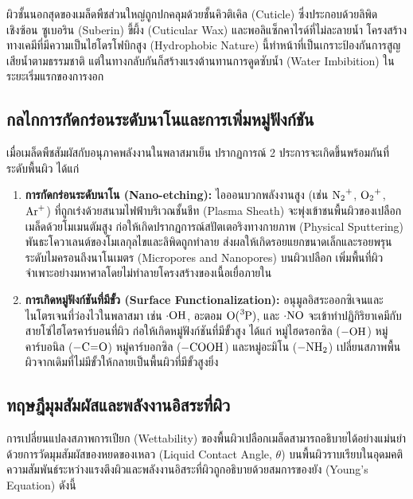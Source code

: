 ผิวชั้นนอกสุดของเมล็ดพืชส่วนใหญ่ถูกปกคลุมด้วยชั้นคิวติเคิล (Cuticle) ซึ่งประกอบด้วยลิพิดเชิงซ้อน ซูเบอริน (Suberin) ขี้ผึ้ง (Cuticular Wax) และพอลิแซ็กคาไรด์ที่ไม่ละลายน้ำ โครงสร้างทางเคมีที่มีความเป็นไฮโดรโฟบิกสูง (Hydrophobic Nature) นี้ทำหน้าที่เป็นเกราะป้องกันการสูญเสียน้ำตามธรรมชาติ แต่ในทางกลับกันก็สร้างแรงต้านทานการดูดซับน้ำ (Water Imbibition) ในระยะเริ่มแรกของการงอก

\subsection{กลไกการกัดกร่อนระดับนาโนและการเพิ่มหมู่ฟังก์ชัน}

เมื่อเมล็ดพืชสัมผัสกับอนุภาคพลังงานในพลาสมาเย็น ปรากฏการณ์ 2 ประการจะเกิดขึ้นพร้อมกันที่ระดับพื้นผิว ได้แก่

\begin{enumerate}
    \item \textbf{การกัดกร่อนระดับนาโน (Nano-etching):} ไอออนบวกพลังงานสูง (เช่น $\ce{N2+}$, $\ce{O2+}$, $\ce{Ar+}$) ที่ถูกเร่งด้วยสนามไฟฟ้าบริเวณชั้นชีท (Plasma Sheath) จะพุ่งเข้าชนพื้นผิวของเปลือกเมล็ดด้วยโมเมนตัมสูง ก่อให้เกิดปรากฏการณ์สปัตเตอริงทางกายภาพ (Physical Sputtering) พันธะโควาเลนต์ของโมเลกุลไขและลิพิดถูกทำลาย ส่งผลให้เกิดรอยแยกขนาดเล็กและรอยพรุนระดับไมครอนถึงนาโนเมตร (Micropores and Nanopores) บนผิวเปลือก เพิ่มพื้นที่ผิวจำเพาะอย่างมหาศาลโดยไม่ทำลายโครงสร้างของเนื้อเยื่อภายใน
    
    \item \textbf{การเกิดหมู่ฟังก์ชันที่มีขั้ว (Surface Functionalization):} อนุมูลอิสระออกซิเจนและไนโตรเจนที่ว่องไวในพลาสมา เช่น $\cdot\ce{OH}$, อะตอม $\ce{O(^3P)}$, และ $\cdot\ce{NO}$ จะเข้าทำปฏิกิริยาเคมีกับสายโซ่ไฮโดรคาร์บอนที่ผิว ก่อให้เกิดหมู่ฟังก์ชันที่มีขั้วสูง ได้แก่ หมู่ไฮดรอกซิล ($-\ce{OH}$) หมู่คาร์บอนิล ($-\ce{C=O}$) หมู่คาร์บอกซิล ($-\ce{COOH}$) และหมู่อะมิโน ($-\ce{NH2}$) เปลี่ยนสภาพพื้นผิวจากเดิมที่ไม่มีขั้วให้กลายเป็นพื้นผิวที่มีขั้วสูงยิ่ง
\end{enumerate}

\subsection{ทฤษฎีมุมสัมผัสและพลังงานอิสระที่ผิว}

การเปลี่ยนแปลงสภาพการเปียก (Wettability) ของพื้นผิวเปลือกเมล็ดสามารถอธิบายได้อย่างแม่นยำด้วยการวัดมุมสัมผัสของหยดของเหลว (Liquid Contact Angle, $\theta$) บนพื้นผิวราบเรียบในอุดมคติ ความสัมพันธ์ระหว่างแรงตึงผิวและพลังงานอิสระที่ผิวถูกอธิบายด้วยสมการของยัง (Young's Equation) ดังนี้

